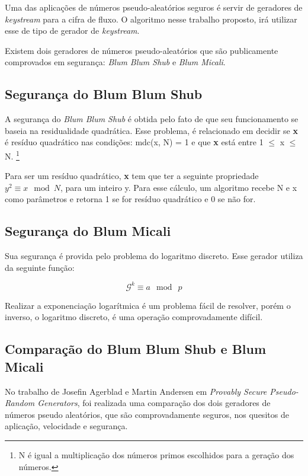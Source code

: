 Uma das aplicações de números pseudo-aleatórios seguros é servir de geradores de \textit{keystream} para a cifra de fluxo. O algoritmo nesse trabalho proposto, irá utilizar esse de tipo de gerador de \textit{keystream}.

Existem dois geradores de números pseudo-aleatórios que são publicamente comprovados em segurança: \textit{Blum Blum Shub} e \textit{Blum Micali}.

\subsection{Segurança do Blum Blum Shub}

A segurança do \textit{Blum Blum Shub} é obtida pelo fato de que seu funcionamento se baseia na residualidade quadrática. Esse problema, é relacionado em decidir se \textbf{x} é resíduo quadrático nas condições: mdc(x, N) = 1 e que \textbf{x} está entre 1 $\le$  x $\le$ N. \footnote{N é igual a multiplicação dos números primos escolhidos para a geração dos números.}

Para ser um resíduo quadrático, \textbf{x} tem que ter a seguinte propriedade $y ^ 2 \equiv x \: \bmod N$, para um inteiro y. Para esse cálculo, um algoritmo recebe N e x como parâmetros e retorna 1 se for resíduo quadrático e 0 se não for\cite{josefin-martin}.

\subsection{Segurança do Blum Micali}

Sua segurança é provida pelo problema do logaritmo discreto. Esse gerador utiliza da seguinte função:

\begin{equation}
	\mathcal{G}^k \equiv a \: \bmod \: p 
\end{equation}

Realizar a exponenciação logarítmica é um problema fácil de resolver, porém o inverso, o logaritmo discreto, é uma operação comprovadamente difícil.

\subsection{Comparação do Blum Blum Shub e Blum Micali}

No trabalho de Josefin Agerblad e  Martin Andersen em \textit{Provably Secure Pseudo-Random Generators}, foi realizada uma comparação dos dois geradores de números pseudo aleatórios, que são comprovadamente seguros, nos quesitos de aplicação, velocidade e segurança.

